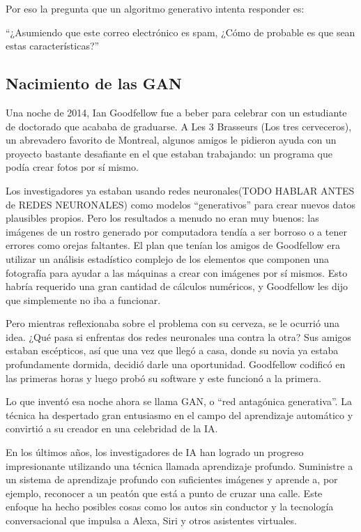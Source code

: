 \documentclass[a4paper]{article}
\begin{document}
Por eso la pregunta que un algoritmo generativo intenta responder es:

``¿Asumiendo que este correo electrónico es spam, ¿Cómo de probable es que sean estas 
características?''

\subsection{Nacimiento de las GAN}
Una noche de 2014, Ian Goodfellow fue a beber para celebrar con un estudiante de doctorado 
que acababa de graduarse. A
Les 3 Brasseurs (Los tres cerveceros), un abrevadero favorito de Montreal, algunos amigos 
le pidieron ayuda con un proyecto bastante desafiante en el que estaban trabajando: 
un programa que podía crear fotos por sí mismo.

Los investigadores ya estaban usando redes neuronales(TODO HABLAR ANTES de REDES NEURONALES) 
como modelos ``generativos'' para crear nuevos datos plausibles propios. Pero los resultados a 
menudo no eran muy buenos: las imágenes de un rostro generado por computadora tendía a ser 
borroso o a tener errores como orejas faltantes. El plan que tenían los amigos de Goodfellow 
era utilizar un análisis estadístico complejo de los elementos que componen una fotografía 
para ayudar a las máquinas a crear con imágenes por sí mismos. Esto habría requerido una 
gran cantidad de cálculos numéricos, y Goodfellow les dijo que simplemente no iba a funcionar.

Pero mientras reflexionaba sobre el problema con su cerveza, se le ocurrió una idea. 
¿Qué pasa si enfrentas dos redes neuronales una contra la otra? Sus amigos estaban 
escépticos, así que una vez que llegó a casa, donde su novia ya estaba profundamente 
dormida, decidió darle una oportunidad. Goodfellow codificó en las primeras horas y 
luego probó su software y este funcionó a la primera.

Lo que inventó esa noche ahora se llama GAN, o ``red antagónica generativa''. La técnica 
ha despertado gran entusiasmo en el campo del aprendizaje automático y convirtió a su 
creador en una celebridad de la IA.

En los últimos años, los investigadores de IA han logrado un progreso impresionante 
utilizando una técnica llamada aprendizaje profundo. Suministre a un sistema de 
aprendizaje profundo con suficientes imágenes y aprende a, por ejemplo, reconocer 
a un peatón que está a punto de cruzar una calle. Este enfoque ha hecho posibles 
cosas como los autos sin conductor y la tecnología conversacional que impulsa a 
Alexa, Siri y otros asistentes virtuales.
\end{document}
